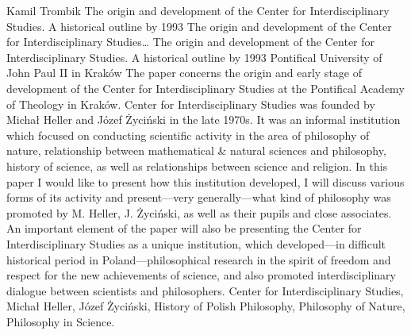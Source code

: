 \begin{artengenv}{Kamil Trombik}
	{The origin and development of the Center for Interdisciplinary Studies. A historical outline by 1993}
	{The origin and development of the Center for Interdisciplinary Studies\ldots}
	{The origin and development of the Center for Interdisciplinary Studies. A historical outline by 1993}
	{Pontifical University of John Paul II in Kraków\label{trombik-start}}
	{The paper concerns the origin and early stage of development of the Center for Interdisciplinary Studies at the
		Pontifical Academy of Theology in Kraków. Center for Interdisciplinary Studies was founded by Michał Heller and Józef
		Życiński in the late 1970s. It was an informal institution which focused on conducting scientific activity in the area
		of philosophy of nature, relationship between mathematical \& natural sciences and philosophy, history of science, as
		well as relationships between science and religion. In this paper I would like to present how this institution
		developed, I will discuss various forms of its activity and present---very generally---what kind of philosophy was promoted
		by M. Heller, J. Życiński, as well as their pupils and close associates. An important element of the paper will also be
		presenting the Center for Interdisciplinary Studies as a unique institution, which developed---in difficult historical
		period in Poland---philosophical research in the spirit of freedom and respect for the new achievements of science, and
		also promoted interdisciplinary dialogue between scientists and philosophers.}
	{Center for Interdisciplinary Studies, Michał Heller, Józef Życiński, History of Polish Philosophy, Philosophy of Nature, Philosophy in Science.}





\end{artengenv}
